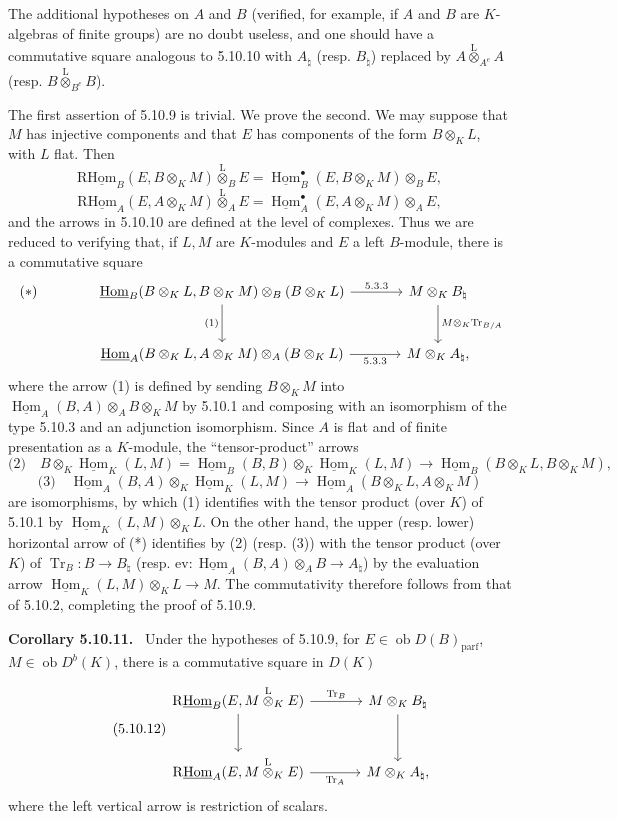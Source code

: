 \documentclass[11pt]{article}
\providecommand{\uHom}{\underline{\Hom}}
\newenvironment{statement}[1]{\par\medskip\noindent\textbf{#1.}\ }{\par\medskip}
\DeclareMathOperator{\Hom}{Hom}
\newcommand{\ob}{\operatorname{ob}}
\providecommand{\Tr}{\operatorname{Tr}}
\providecommand{\Tr}{\operatorname{Tr}}
\providecommand{\lten}{\overset{\mathrm L}{\otimes}}
\providecommand{\Tr}{\operatorname{Tr}}
\providecommand{\Hom}{\operatorname{Hom}}
\providecommand{\ob}{\operatorname{ob}}
\providecommand{\lten}{\overset{\mathrm L}{\otimes}}
\providecommand{\lten}{\overset{\mathrm L}{\otimes}}
\providecommand{\Tr}{\operatorname{Tr}}
\providecommand{\lten}{\overset{\mathrm L}{\otimes}}
\providecommand{\lten}{\overset{\mathrm L}{\otimes}}
\providecommand{\lten}{\overset{\mathrm L}{\otimes}}
\providecommand{\Hom}{\operatorname{Hom}}
\providecommand{\Tr}{\operatorname{Tr}}
\providecommand{\lten}{\overset{\mathrm L}{\otimes}}
\begin{document}
The additional hypotheses on $A$ and $B$ (verified, for example, if $A$ and $B$ are $K$-algebras of finite groups) are no doubt useless, and one should have a commutative square analogous to 5.10.10 with $A_\natural$ (resp. $B_\natural$) replaced by $A\lten_{A^e}A$ (resp. $B\lten_{B^e}B$).

The first assertion of 5.10.9 is trivial. We prove the second. We may suppose that $M$ has injective components and that $E$ has components of the form $B\otimes_KL$, with $L$ flat. Then
\[
\mathrm{R}\underline{\mathrm{Hom}}_B(E,B\otimes_KM)\lten_BE=\uHom_B^\bullet(E,B\otimes_KM)\otimes_BE,
\]
\[
\mathrm{R}\underline{\mathrm{Hom}}_A(E,A\otimes_KM)\lten_AE=\uHom_A^\bullet(E,A\otimes_KM)\otimes_AE,
\]
and the arrows in 5.10.10 are defined at the level of complexes. Thus we are reduced to verifying that, if $L,M$ are $K$-modules and $E$ a left $B$-module, there is a commutative square
\[
\begin{tikzcd}[column sep=large,row sep=large]
|[alias=star]| {(*)} & \uHom_B(B\otimes_KL,B\otimes_KM)\otimes_B(B\otimes_KL) \arrow[r,"5.3.3"] \arrow[d,"(1)"'] & M\otimes_KB_\natural \arrow[d,"M\otimes_K\Tr_{B/A}"]\\
& \uHom_A(B\otimes_KL,A\otimes_KM)\otimes_A(B\otimes_KL) \arrow[r,"5.3.3"'] & M\otimes_KA_\natural,
\end{tikzcd}
\]
where the arrow (1) is defined by sending $B\otimes_KM$ into $\uHom_A(B,A)\otimes_AB\otimes_KM$ by 5.10.1 and composing with an isomorphism of the type 5.10.3 and an adjunction isomorphism. Since $A$ is flat and of finite presentation as a $K$-module, the ``tensor-product'' arrows
\[
\text{(2)}\quad B\otimes_K\uHom_K(L,M)=\uHom_B(B,B)\otimes_K\uHom_K(L,M)\to\uHom_B(B\otimes_KL,B\otimes_KM),
\]
\[
\text{(3)}\quad \uHom_A(B,A)\otimes_K\uHom_K(L,M)\to\uHom_A(B\otimes_KL,A\otimes_KM)
\]
are isomorphisms, by which (1) identifies with the tensor product (over $K$) of 5.10.1 by $\uHom_K(L,M)\otimes_KL$. On the other hand, the upper (resp. lower) horizontal arrow of (*) identifies by (2) (resp. (3)) with the tensor product (over $K$) of $\Tr_B:B\to B_\natural$ (resp. $\mathrm{ev}:\uHom_A(B,A)\otimes_AB\to A_\natural$) by the evaluation arrow $\uHom_K(L,M)\otimes_KL\to M$. The commutativity therefore follows from that of 5.10.2, completing the proof of 5.10.9.

\begin{statement}{Corollary 5.10.11}
Under the hypotheses of 5.10.9, for $E\in\ob D(B)_{\mathrm{parf}}$, $M\in\ob D^b(K)$, there is a commutative square in $D(K)$
\begin{equation}\tag{5.10.12}
\begin{tikzcd}[column sep=large,row sep=large]
\mathrm{R}\underline{\mathrm{Hom}}_B(E,M\lten_KE) \arrow[r,"\Tr_B"] \arrow[d] & M\otimes_KB_\natural \arrow[d]\\
\mathrm{R}\underline{\mathrm{Hom}}_A(E,M\lten_KE) \arrow[r,"\Tr_A"'] & M\otimes_KA_\natural,
\end{tikzcd}
\end{equation}
where the left vertical arrow is restriction of scalars.
\end{statement}
\end{document}
